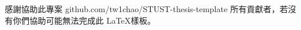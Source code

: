 \renewcommand{\acknowledgementname}{誌\hspace{2em}謝}
\clearpage
{}
\begin{acknowledgements}

感謝協助此專案 github.com/tw1chao/STUST-thesis-template 所有貢獻者，若沒有你們協助可能無法完成此 \LaTeX 樣板。

\end{acknowledgements} 
